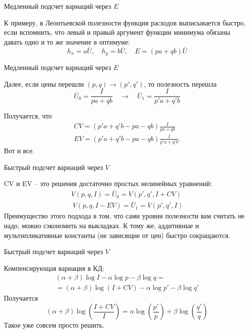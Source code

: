 \documentclass{beamer}
\begin{document}
\begin{frame}{Медленный подсчет вариаций через $E$}

К примеру, в Леонтьевской полезности функция расходов выписывается быстро, если вспомнить, что левый и правый аргумент функции минимума обязаны давать одно и то же значение в оптимуме: 
$$h_x = a \bar U, \quad h_y = b \bar U, \quad E = (pa + qb) \bar U$$
\end{frame}

\begin{frame}{Медленный подсчет вариаций через $E$}

Далее, если цены перешли $(p,q) \to (p',q')$, то полезность перешла 
$$ \bar U_0 = \frac{I}{pa + qb} \quad \to \quad \bar U_1 = \frac{I}{p'a + q'b} $$

Получается, что
\begin{gather*}
CV = (p'a + q' b - pa - qb) \frac{I}{pa + qb}\\
EV = (p'a + q' b - pa - qb) \frac{I}{p' a + q' b}.
\end{gather*}
Вот и все.
\end{frame}

\begin{frame}{Быстрый подсчет вариаций через $V$}

CV и EV  – это решения достаточно простых нелинейных уравнений:
\begin{gather*}
V(p,q,I) = \bar U_0 = V(p',q',I+CV)\\\
V(p,q,I-EV) = \bar U_1 = V(p',q',I)
\end{gather*}
Преимущество этого подхода в том, что сами уровни полезности вам считать не надо, можно сэкономить на выкладках. К тому же, аддитивные и мультипликативные константы (не зависящие от цен) быстро сокращаются.

\end{frame}

\begin{frame}{Быстрый подсчет вариаций через $V$}

Компенсирующая вариация в КД:
\begin{gather*}
 (\alpha + \beta)\log I - \alpha \log p - \beta \log q = \\
 = (\alpha + \beta)\log (I+CV) - \alpha \log p' - \beta \log q'
\end{gather*}
Получается
$$(\alpha + \beta)\log(\frac{I+CV}{I}) = \alpha \log (\frac{p'}{p}) + \beta \log (\frac{q'}{q})$$
Такое уже совсем просто решить.
\end{frame}
\end{document}
